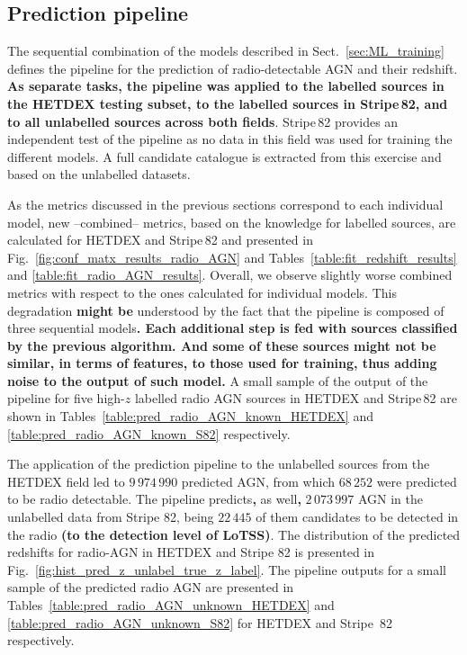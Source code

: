 \documentclass{aa}
\begin{document}
\subsection{Prediction pipeline}\label{sec:results_prediction_pipeline}

The sequential combination of the models described in Sect.~\ref{sec:ML_training} defines the pipeline for the prediction of radio-detectable AGN and their redshift. \textbf{As separate tasks, the pipeline was applied to the labelled sources in the HETDEX \textbf{testing} subset, to the labelled sources in Stripe\,82, and to all unlabelled sources across both fields}. Stripe\,82 provides an independent test of the pipeline as no data in this field was used for training the different models. A full candidate catalogue is extracted from this exercise and based on the unlabelled datasets.

As the metrics discussed in the previous sections correspond to each individual model, new --combined-- metrics, based on the knowledge for labelled sources, are calculated for HETDEX and Stripe\,82 and presented in Fig.~\ref{fig:conf_matx_results_radio_AGN} and Tables~\ref{table:fit_redshift_results} and \ref{table:fit_radio_AGN_results}. Overall, we observe slightly worse combined metrics  with respect to the ones calculated for individual models. This degradation \textbf{might be} understood by the fact that the pipeline is composed of three sequential models\textbf{. Each additional step is fed with sources classified by the previous algorithm. And some of these sources might not be similar, in terms of features, to those used for training, thus adding noise to the output of such model.} A small sample of the output of the pipeline for five high-$z$ labelled radio AGN sources in HETDEX and Stripe\,82 are shown in Tables~\ref{table:pred_radio_AGN_known_HETDEX} and \ref{table:pred_radio_AGN_known_S82} respectively.

The application of the prediction pipeline to the unlabelled sources from the HETDEX field led to $9\,974\,990$ predicted AGN, from which $68\,252$ were predicted to be radio detectable. The pipeline predicts\textbf{,} as well\textbf{,} $2\,073\,997$ AGN in the unlabelled data from Stripe 82, being $22\,445$ of them candidates to be detected in the radio \textbf{(to the detection level of LoTSS)}. 
The distribution of the predicted redshifts for radio-AGN in HETDEX and Stripe 82 is presented in  Fig.~\ref{fig:hist_pred_z_unlabel_true_z_label}. The pipeline outputs for a small sample of the predicted radio AGN are presented in Tables~\ref{table:pred_radio_AGN_unknown_HETDEX} and \ref{table:pred_radio_AGN_unknown_S82} for HETDEX and Stripe\, 82 respectively.
\end{document}
